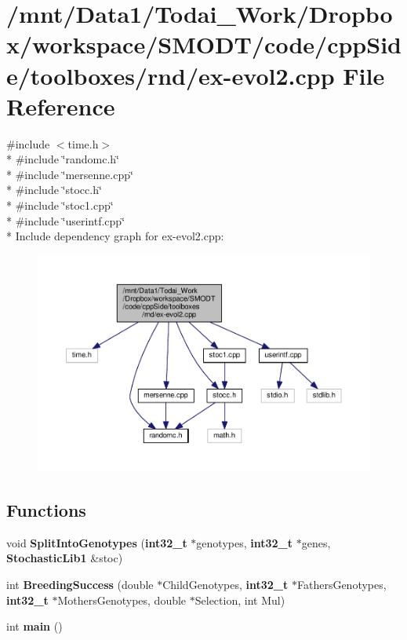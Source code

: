 \section{/mnt/\-Data1/\-Todai\-\_\-\-Work/\-Dropbox/workspace/\-S\-M\-O\-D\-T/code/cpp\-Side/toolboxes/rnd/ex-\/evol2.cpp File Reference}
\label{toolboxes_2rnd_2ex-evol2_8cpp}
{\ttfamily \#include $<$time.\-h$>$}\\*
{\ttfamily \#include \char`\"{}randomc.\-h\char`\"{}}\\*
{\ttfamily \#include \char`\"{}mersenne.\-cpp\char`\"{}}\\*
{\ttfamily \#include \char`\"{}stocc.\-h\char`\"{}}\\*
{\ttfamily \#include \char`\"{}stoc1.\-cpp\char`\"{}}\\*
{\ttfamily \#include \char`\"{}userintf.\-cpp\char`\"{}}\\*
Include dependency graph for ex-\/evol2.cpp\-:\nopagebreak
\begin{figure}[H]
\begin{center}
\leavevmode
\includegraphics[width=350pt]{toolboxes_2rnd_2ex-evol2_8cpp__incl}
\end{center}
\end{figure}
\subsection*{Functions}
\begin{DoxyCompactItemize}
\item 
void {\bf Split\-Into\-Genotypes} ({\bf int32\-\_\-t} $\ast$genotypes, {\bf int32\-\_\-t} $\ast$genes, {\bf Stochastic\-Lib1} \&stoc)
\item 
int {\bf Breeding\-Success} (double $\ast$Child\-Genotypes, {\bf int32\-\_\-t} $\ast$Fathers\-Genotypes, {\bf int32\-\_\-t} $\ast$Mothers\-Genotypes, double $\ast$Selection, int Mul)
\item 
int {\bf main} ()
\end{DoxyCompactItemize}


